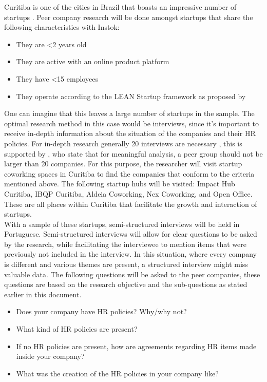 \documentclass[man]{apa6}
\begin{document}
Curitiba is one of the cities in Brazil that boasts an impressive number of startups \parencite{SANTANA2016}. Peer company research will be done amongst startups that share the following characteristics with Instok:
\begin{itemize}
\item They are <2 years old
\item They are active with an online product platform
\item They have <15 employees
\item They operate according to the LEAN Startup framework as proposed by \cite{RIES2011}
\end{itemize}

One can imagine that this leaves a large number of startups in the sample. The optimal research method in this case would be interviews, since it's important to receive in-depth information about the situation of the companies and their HR policies. For in-depth research generally 20 interviews are necessary \parencite{BAKEREDWARDS2012}, this is supported by \cite{SNL2013}, who state that for meaningful analysis, a peer group should not be larger than 20 companies. For this purpose, the researcher will visit startup coworking spaces in Curitiba to find the companies that conform to the criteria mentioned above. The following startup hubs will be visited: Impact Hub Curitiba, IBQP Curitiba, Aldeia Coworking, Nex Coworking, and Open Office. These are all places within Curitiba that facilitate the growth and interaction of startups. \\

With a sample of these startups, semi-structured interviews will be held in Portuguese. Semi-structured interviews will allow for clear questions to be asked by the research, while facilitating the interviewee to mention items that were previously not included in the interview. In this situation, where every company is different and various themes are present, a structured interview might miss valuable data. The following questions will be asked to the peer companies, these questions are based on the research objective and the sub-questions as stated earlier in this document.
\begin{itemize}
\item Does your company have HR policies? Why/why not?
\item What kind of HR policies are present?
\item If no HR policies are present, how are agreements regarding HR items made inside your company?
\item What was the creation of the HR policies in your company like?
\end{itemize}
\end{document}
